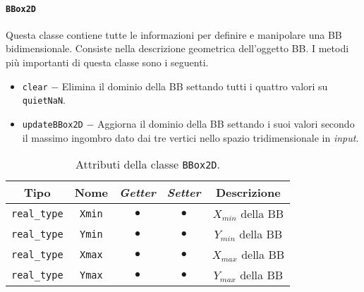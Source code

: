\paragraph{\texttt{BBox2D}}
Questa classe contiene tutte le informazioni per definire e manipolare una \ac{BB} bidimensionale. Consiste nella descrizione geometrica dell'oggetto \ac{BB}.  I metodi più importanti di questa classe sono i seguenti.
\begin{itemize}
	\item \texttt{clear} $-$ Elimina il dominio della \ac{BB} settando tutti i quattro valori su \texttt{quietNaN}.
	\item \texttt{updateBBox2D} $-$ Aggiorna il dominio della \ac{BB} settando i suoi valori secondo il massimo ingombro dato dai tre vertici nello spazio tridimensionale in \textit{input}.
\end{itemize}
\begin{table}[h!]
	\centering
	\begin{tabular}{|c|c|c|c|c|}
		\hline 
		\textbf{Tipo} & \textbf{Nome} & \textit{\textbf{Getter}} & \textit{\textbf{Setter}} & \textbf{Descrizione} \\ \hline 
		\texttt{real\_type} & \texttt{Xmin} & $\bullet$ & $\bullet$ & $X_{min}$ della \ac{BB} \\ \hline 
		\texttt{real\_type} & \texttt{Ymin} & $\bullet$ & $\bullet$ & $Y_{min}$ della \ac{BB} \\ \hline
		\texttt{real\_type} & \texttt{Xmax} & $\bullet$ & $\bullet$ & $X_{max}$ della \ac{BB} \\ \hline
		\texttt{real\_type} & \texttt{Ymax} & $\bullet$ & $\bullet$ & $Y_{max}$ della \ac{BB} \\ \hline
	\end{tabular}
	\caption{Attributi della classe \texttt{BBox2D}.}
	\label{BBox2D}
\end{table}
%
